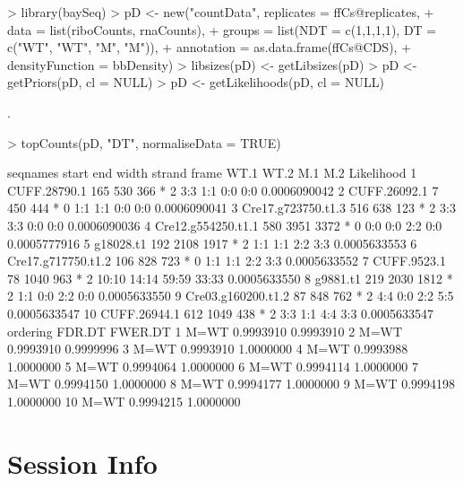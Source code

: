 \documentclass[a4paper]{article}
\begin{document}
\begin{Schunk}
\begin{Sinput}
> library(baySeq)
> pD <- new("countData", replicates = ffCs@replicates, 
+           data = list(riboCounts, rnaCounts),
+           groups = list(NDT = c(1,1,1,1), DT = c("WT", "WT", "M", "M")),
+           annotation = as.data.frame(ffCs@CDS),
+           densityFunction = bbDensity)
> libsizes(pD) <- getLibsizes(pD)
> pD <- getPriors(pD, cl = NULL)
> pD <- getLikelihoods(pD, cl = NULL)
\end{Sinput}
\begin{Soutput}
.
\end{Soutput}
\begin{Sinput}
> topCounts(pD, "DT", normaliseData = TRUE)
\end{Sinput}
\begin{Soutput}
             seqnames start  end width strand frame  WT.1  WT.2   M.1   M.2   Likelihood
1        CUFF.28790.1   165  530   366      *     2   3:3   1:1   0:0   0:0 0.0006090042
2        CUFF.26092.1     7  450   444      *     0   1:1   1:1   0:0   0:0 0.0006090041
3  Cre17.g723750.t1.3   516  638   123      *     2   3:3   3:3   0:0   0:0 0.0006090036
4  Cre12.g554250.t1.1   580 3951  3372      *     0   0:0   0:0   2:2   0:0 0.0005777916
5           g18028.t1   192 2108  1917      *     2   1:1   1:1   2:2   3:3 0.0005633553
6  Cre17.g717750.t1.2   106  828   723      *     0   1:1   1:1   2:2   3:3 0.0005633552
7         CUFF.9523.1    78 1040   963      *     2 10:10 14:14 59:59 33:33 0.0005633550
8            g9881.t1   219 2030  1812      *     2   1:1   0:0   2:2   0:0 0.0005633550
9  Cre03.g160200.t1.2    87  848   762      *     2   4:4   0:0   2:2   5:5 0.0005633547
10       CUFF.26944.1   612 1049   438      *     2   3:3   1:1   4:4   3:3 0.0005633547
   ordering    FDR.DT   FWER.DT
1      M=WT 0.9993910 0.9993910
2      M=WT 0.9993910 0.9999996
3      M=WT 0.9993910 1.0000000
4      M=WT 0.9993988 1.0000000
5      M=WT 0.9994064 1.0000000
6      M=WT 0.9994114 1.0000000
7      M=WT 0.9994150 1.0000000
8      M=WT 0.9994177 1.0000000
9      M=WT 0.9994198 1.0000000
10     M=WT 0.9994215 1.0000000
\end{Soutput}
\end{Schunk}

\section*{Session Info}
\end{document}
